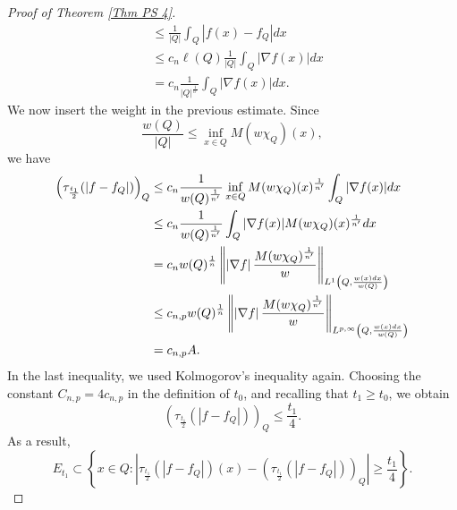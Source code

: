 \documentclass[10pt,a4paper]{amsart}
\newcommand{\strt}[1]{\rule{0pt}{#1}}
\begin{document}
\begin{proof}[Proof of Theorem \ref{Thm PS 4}]
\begin{align*}
    &\le \frac{1}{|Q|}\int_Q |f(x)-f_Q|dx \\
    &\le c_n \ell(Q) \frac{1}{|Q|} \int_Q |\nabla f(x)|dx \\
    &= c_n \frac{1}{|Q|^\frac{1}{n'}} \int_Q |\nabla f(x)|dx.
\end{align*}
We now insert the weight in the previous estimate. Since
\begin{equation*}
    \frac{w(Q)}{|Q|} \le \inf_{x\in Q} M(w\chi_Q)(x),
\end{equation*}
we have
\begin{align*}
    \left(\tau_{\frac{t_1}{2}}(|f-f_Q|)\right)_Q
    &\le c_n \frac{1}{w(Q)^\frac{1}{n'}} \inf_{x\in Q} M(w\chi_Q)(x)^\frac{1}{n'} \int_Q |\nabla f(x)|dx \\
    &\le c_n \frac{1}{w(Q)^\frac{1}{n'}} \int_Q |\nabla f(x)|M(w\chi_Q)(x)^\frac{1}{n'}dx \\
    &= c_n w(Q)^\frac{1}{n} \left\| \left| \nabla f \right| \frac{M(w\chi_Q)^\frac{1}{n'}}{w} \right\|_{\strt{2.3ex} L^1\left(Q,\frac{w(x)dx}{w(Q)}\right)} \\
    &\le c_{n,p} w(Q)^\frac{1}{n} \left\| \left| \nabla f \right| \frac{M(w\chi_Q)^\frac{1}{n'}}{w} \right\|_{\strt{2.3ex} L^{p,\infty}\left(Q,\frac{w(x)dx}{w(Q)}\right)} \\
    &= c_{n,p}A.
\end{align*}
In the last inequality, we used Kolmogorov's inequality again. Choosing the constant $C_{n,p} = 4c_{n,p}$ in the definition of $t_0$, and recalling that $t_1\ge t_0$, we obtain
\begin{equation*}
    \left(\tau_{\frac{t_1}{2}}(|f-f_Q|)\right)_Q \le \frac{t_1}{4}.
\end{equation*}
As a result,
\begin{equation*}
    E_{t_1} \subset \left\{x\in Q:\left| \tau_{\frac{t_1}{2}}(|f-f_Q|)(x)-\left(\tau_{\frac{t_1}{2}}(|f-f_Q|)\right)_Q \right| \ge \frac{t_1}{4}\right\}.
\end{equation*}


\end{proof}
\end{document}
